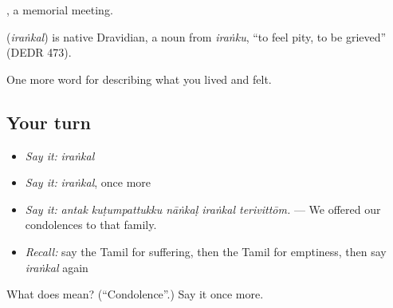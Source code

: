  , a memorial meeting.

\begin{cousinweb}
\textbf{} (\emph{iraṅkal}) is native Dravidian, a noun from  \emph{iraṅku}, \textquotedblleft{}to feel pity, to be grieved\textquotedblright{} (DEDR 473).
\end{cousinweb}

\begin{grammarlens}[title={What you've built}]
One more word for describing what you lived and felt.
\end{grammarlens}

\subsection*{Your turn}
\begin{itemize}
\raggedright
  \item \emph{Say it:} \emph{iraṅkal}
  \item \emph{Say it:} \emph{iraṅkal}, once more
  \item \emph{Say it:} \emph{antak kuṭumpattukku nāṅkaḷ iraṅkal terivittōm.} — We offered our condolences to that family.
  \item \emph{Recall:} say the Tamil for suffering, then the Tamil for emptiness, then say \emph{iraṅkal} again
\end{itemize}

\begin{tcolorbox}[breakable,colback=teal!4,colframe=teal!35!black,title={Before you move on}]
What does  mean? (\textquotedblleft{}Condolence\textquotedblright{}.) Say it once more.
\end{tcolorbox}
